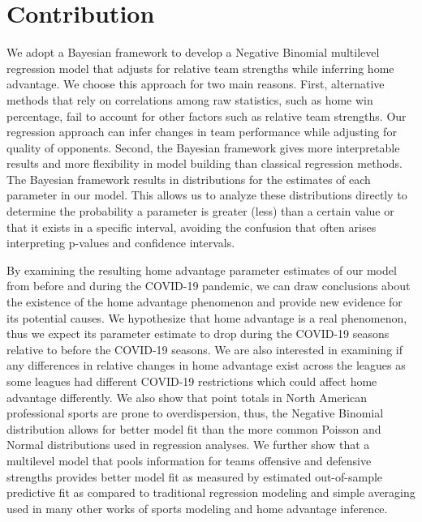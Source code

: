 \section{Contribution}

We adopt a Bayesian framework to develop a Negative Binomial multilevel regression model that adjusts for relative team strengths while inferring home advantage. We choose this approach for two main reasons. First, alternative methods that rely on correlations among raw statistics, such as home win percentage, fail to account for other factors such as relative team strengths. Our regression approach can infer changes in team performance while adjusting for quality of opponents. Second, the Bayesian framework gives more interpretable results and more flexibility in model building than classical regression methods. The Bayesian framework results in distributions for the estimates of each parameter in our model. This allows us to analyze these distributions directly to determine the probability a parameter is greater (less) than a certain value or that it exists in a specific interval, avoiding the confusion that often arises interpreting p-values and confidence intervals.

By examining the resulting home advantage parameter estimates of our model from before and during the COVID-19 pandemic, we can draw conclusions about the existence of the home advantage phenomenon and provide new evidence for its potential causes. We hypothesize that home advantage is a real phenomenon, thus we expect its parameter estimate to drop during the COVID-19 seasons relative to before the COVID-19 seasons. We are also interested in examining if any differences in relative changes in home advantage exist across the leagues as some leagues had different COVID-19 restrictions which could affect home advantage differently. We also show that point totals in North American professional sports are prone to overdispersion, thus, the Negative Binomial distribution allows for better model fit than the more common Poisson and Normal distributions used in regression analyses. We further show that a multilevel model that pools information for teams offensive and defensive strengths provides better model fit as measured by estimated out-of-sample predictive fit as compared to traditional regression modeling and simple averaging used in many other works of sports modeling and home advantage inference.

